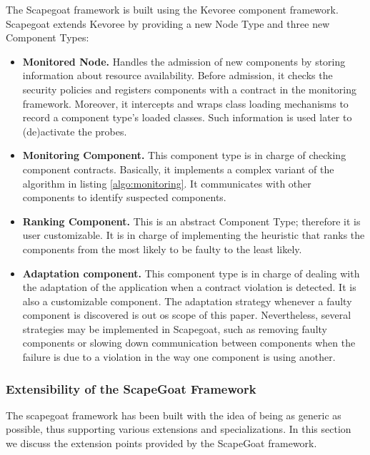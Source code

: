 The Scapegoat framework is built using the Kevoree component framework.
Scapegoat extends Kevoree by providing a new Node Type and three new Component Types:
\begin{itemize}
\leftskip -.2in
\item \textbf{Monitored Node.}
Handles the admission of new components by storing information about resource availability.
Before admission, it checks the security policies and registers components with a contract in the monitoring framework.
Moreover, it intercepts and wraps class loading mechanisms to record a component type's loaded classes.
Such information is used later to (de)activate the probes.
\item \textbf{Monitoring Component.}
This component type is in charge of checking component contracts. 
Basically, it implements a complex variant of the algorithm in listing \ref{algo:monitoring}.
It communicates with other components to identify suspected components.
\item \textbf{Ranking Component.}
This is an abstract Component Type; therefore it is user customizable.
It is in charge of implementing the heuristic that ranks the components from the most likely to be faulty to the least likely.
\item \textbf{Adaptation component.}
This component type is in charge of dealing with the adaptation of the application when a contract violation is detected.
It is also a customizable component.
The adaptation strategy whenever a faulty component is discovered is out os scope of this paper.
Nevertheless, several strategies may be implemented in Scapegoat, such as removing faulty components or slowing down communication between components when the failure is due to a violation in the way one component is using another.
\end{itemize}

\subsubsection{Extensibility of the ScapeGoat Framework}

The scapegoat framework has been built with the idea of being as generic as possible, thus supporting various extensions and specializations.
In this section we discuss the extension points provided by the ScapeGoat framework.

